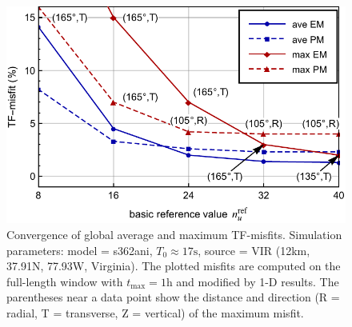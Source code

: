 \documentclass[extra,referee]{gji}
\begin{document}
\begin{figure}
  \centering
  \includegraphics[width=.6\textwidth]{fig/conv_empm/nu_misfit.pdf}
  \caption{Convergence of global average and maximum TF-misfits. 
  Simulation parameters: model = s362ani, $T_0\approx17\text{s}$, 
  source = VIR (12km, 37.91\degr N, 77.93\degr W, Virginia).
  The plotted misfits are computed on the full-length window with 
  $t_\text{max}=1\text{h}$ and modified by 1-D results.
  The parentheses near a data point show the distance and 
  direction (R = radial, T = transverse, Z = vertical) 
  of the maximum misfit.} 
  \label{fig:empm}
\end{figure}
  
\end{document}
